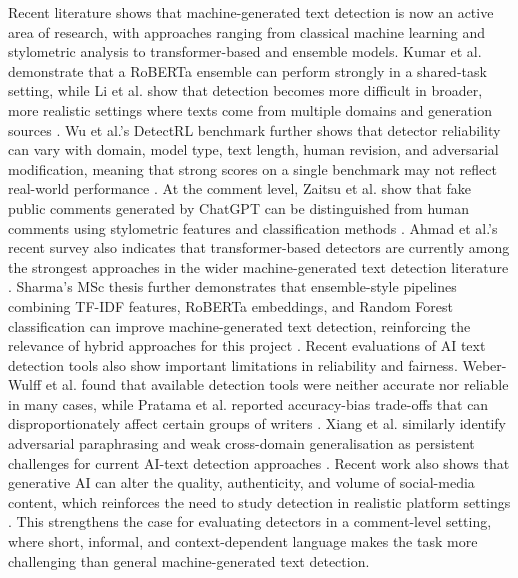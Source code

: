 \documentclass[conference]{IEEEtran}
\begin{document}
Recent literature shows that machine-generated text detection is now an active area of research, with approaches ranging from classical machine learning and stylometric analysis to transformer-based and ensemble models. 
Kumar et al. demonstrate that a RoBERTa ensemble can perform strongly in a shared-task setting, while Li et al. show that detection becomes more difficult in broader, 
more realistic settings where texts come from multiple domains and generation sources \cite{kumar_m_scalar_2024,li_mage_2024}. 
Wu et al.'s DetectRL benchmark further shows that detector reliability can vary with domain, model type, text length, human revision, and adversarial modification, meaning that strong scores on a single benchmark may not reflect real-world performance \cite{wu_detectrl_2024}.
At the comment level, Zaitsu et al. show that fake public comments generated by ChatGPT can be distinguished from human comments using stylometric features and classification methods \cite{zaitsu_can_2024}. 
Ahmad et al.'s recent survey also indicates that transformer-based detectors are currently among the strongest approaches in the wider machine-generated text detection literature \cite{ahmad_human_2026}.
Sharma's MSc thesis further demonstrates that ensemble-style pipelines combining TF-IDF features, RoBERTa embeddings, and Random Forest classification can improve machine-generated text detection, reinforcing the relevance of hybrid approaches for this project \cite{surbhi_exploring_nodate}.
Recent evaluations of AI text detection tools also show important limitations in reliability and fairness. Weber-Wulff et al. found that available detection tools were neither accurate nor reliable in many cases, while Pratama et al. reported accuracy-bias trade-offs that can disproportionately affect certain groups of writers \cite{weber-wulff_testing_2023,pratama_accuracy-bias_2025}.
Xiang et al. similarly identify adversarial paraphrasing and weak cross-domain generalisation as persistent challenges for current AI-text detection approaches \cite{noauthor_ai-generated_2026}.
Recent work also shows that generative AI can alter the quality, authenticity, and volume of social-media content, which reinforces the need to study detection in realistic platform settings \cite{moller_impact_2026}.
This strengthens the case for evaluating detectors in a comment-level setting, where short, informal, and context-dependent language makes the task more challenging than general machine-generated text detection.
\end{document}

